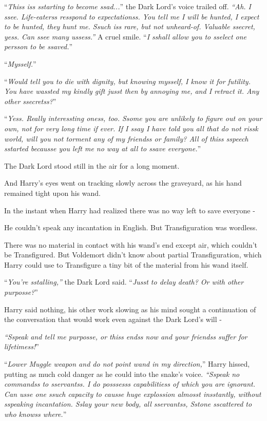 ``\emph{Thiss iss sstarting to become ssad...}'' the Dark Lord's voice trailed off. \emph{``Ah. I ssee. Life-eaterss resspond to expectationss. You tell me I will be hunted, I expect to be hunted, they hunt me. Ssuch iss rare, but not unheard-of. Valuable ssecret, yess. Can ssee many ussess.''} A cruel smile. ``\emph{I sshall allow you to sselect one persson to be ssaved.}''

``\emph{Mysself.}''

``\emph{Would tell you to die with dignity, but knowing mysself, I know it for futility. You have wassted my kindly gift jusst then by annoying me, and I retract it. Any other ssecretss?}''

``\emph{Yess. Really interessting oness, too. Ssome you are unlikely to figure out on your own, not for very long time if ever. If I ssay I have told you all that do not rissk world, will you not torment any of my friendss or family? All of thiss sspeech sstarted becausse you left me no way at all to ssave everyone.}''

The Dark Lord stood still in the air for a long moment.

And Harry's eyes went on tracking slowly across the graveyard, as his hand remained tight upon his wand.

In the instant when Harry had realized there was no way left to save everyone -

He couldn't speak any incantation in English. But Transfiguration was wordless.

There was no material in contact with his wand's end except air, which couldn't be Transfigured. But Voldemort didn't know about partial Transfiguration, which Harry could use to Transfigure a tiny bit of the material from his wand itself.

``\emph{You're sstalling,''} the Dark Lord said. ``\emph{Jusst to delay death? Or with other purposse?}''

Harry said nothing, his other work slowing as his mind sought a continuation of the conversation that would work even against the Dark Lord's will -

\emph{``Sspeak and tell me purposse, or thiss endss now and your friendss suffer for lifetimess!}''

``\emph{Lower Muggle weapon and do not point wand in my direction,}'' Harry hissed, putting as much cold danger as he could into the snake's voice. \emph{``Sspeak no commandss to sservantss. I do posssesss capabilitiess of which you are ignorant. Can usse one ssuch capacity to causse huge explossion almosst insstantly, without sspeaking incantation. Sslay your new body, all sservantss, Sstone sscattered to who knowss where.}''

